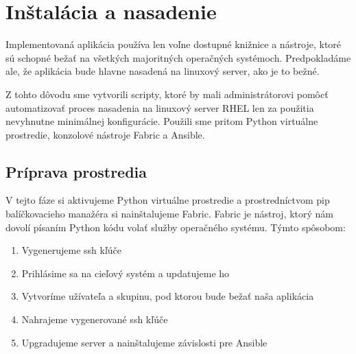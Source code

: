 \chapter{Inštalácia a nasadenie}
Implementovaná aplikácia používa len voľne dostupné knižnice a nástroje, ktoré sú schopné bežať na všetkých majoritných operačných systémoch. Predpokladáme ale, že aplikácia bude hlavne nasadená na linuxový server, ako je to bežné. 
\par Z tohto dôvodu sme vytvorili scripty, ktoré by mali administrátorovi pomôcť automatizovať proces nasadenia na linuxový server RHEL len za použitia nevyhnutne minimálnej konfigurácie. Použili sme pritom Python virtuálne prostredie, konzolové nástroje Fabric a Ansible.

\section{Príprava prostredia}
V tejto fáze si aktivujeme Python virtuálne prostredie a prostredníctvom pip balíčkovacieho manažéra si nainštalujeme Fabric.
Fabric je nástroj, ktorý nám dovolí písaním Python kódu volať služby operačného systému. Týmto spôsobom: 

\begin{enumerate}
  \item Vygenerujeme ssh kľúče
  \item Prihlásime sa na cieľový systém a updatujeme ho
  \item Vytvoríme užívateľa a skupinu, pod ktorou bude bežať naša aplikácia
  \item Nahrajeme vygenerované ssh kľúče
  \item Upgradujeme server a nainštalujeme závislosti pre Ansible
\end{enumerate}
